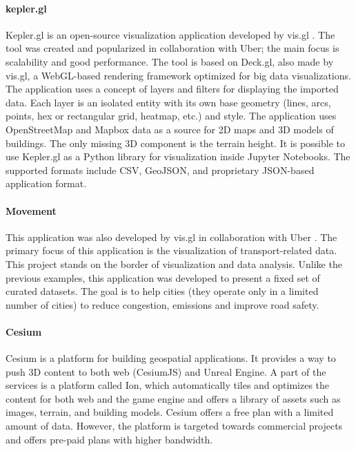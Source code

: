 \paragraph{kepler.gl}
Kepler.gl \cite{uberKepler} is an open-source visualization application developed by vis.gl \cite{visgl}. The tool was created and popularized in collaboration with Uber; the main focus is scalability and good performance. The tool is based on Deck.gl, also made by vis.gl, a WebGL-based rendering framework optimized for big data visualizations. The application uses a concept of layers and filters for displaying the imported data. Each layer is an isolated entity with its own base geometry (lines, arcs, points, hex or rectangular grid, heatmap, etc.) and style. 
The application uses OpenStreetMap \cite{openstreetmap} and Mapbox \cite{mapbox} data as a source for 2D maps and 3D models of buildings. The only missing 3D component is the terrain height. It is possible to use Kepler.gl as a Python library for visualization inside Jupyter Notebooks. The supported formats include CSV, GeoJSON, and proprietary JSON-based application format. 

\paragraph{Movement}
This application was also developed by vis.gl in collaboration with Uber \cite{uberMovement}. The primary focus of this application is the visualization of transport-related data. This project stands on the border of visualization and data analysis. Unlike the previous examples, this application was developed to present a fixed set of curated datasets. The goal is to help cities (they operate only in a limited number of cities) to reduce congestion, emissions and improve road safety.

\paragraph{Cesium}
Cesium \cite{ce2019cesiumjs} is a platform for building geospatial applications. It provides a way to push 3D content to both web (CesiumJS) and Unreal Engine. A part of the services is a platform called Ion, which automatically tiles and optimizes the content for both web and the game engine and offers a library of assets such as images, terrain, and building models. Cesium offers a free plan with a limited amount of data. However, the platform is targeted towards commercial projects and offers pre-paid plans with higher bandwidth.

